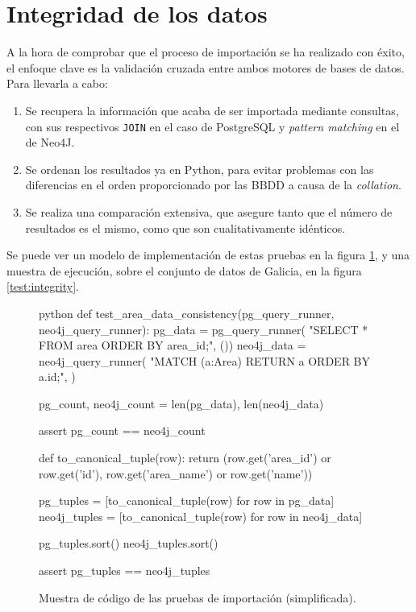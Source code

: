 \section{Integridad de los datos}

A la hora de comprobar que el proceso de importación se ha realizado con éxito, el enfoque clave es la validación cruzada entre ambos motores de bases de datos. Para llevarla a cabo:

\begin{enumerate}
    \item Se recupera la información que acaba de ser importada mediante consultas, con sus respectivos \texttt{JOIN} en el caso de PostgreSQL y \textit{pattern matching} en el de Neo4J.
    \item Se ordenan los resultados ya en Python, para evitar problemas con las diferencias en el orden proporcionado por las BBDD a causa de la \textit{collation}.
    \item Se realiza una comparación extensiva, que asegure tanto que el número de resultados es el mismo, como que son cualitativamente idénticos.
\end{enumerate}

Se puede ver un modelo de implementación de estas pruebas en la figura \ref{test:integrity_code}, y una muestra de ejecución, sobre el conjunto de datos de Galicia, en la figura \ref{test:integrity}.

\begin{figure}[p]
    \centering
    \begin{huggedminted}{python}
def test_area_data_consistency(pg_query_runner, neo4j_query_runner):
    pg_data = pg_query_runner(
        "SELECT * FROM area ORDER BY area_id;", ())
    neo4j_data = neo4j_query_runner(
        "MATCH (a:Area) RETURN a ORDER BY a.id;", {})
    
    pg_count, neo4j_count = len(pg_data), len(neo4j_data)

    assert pg_count == neo4j_count

    def to_canonical_tuple(row):
        return (row.get('area_id') or row.get('id'),
                row.get('area_name') or row.get('name'))

    pg_tuples = [to_canonical_tuple(row) for row in pg_data]
    neo4j_tuples = [to_canonical_tuple(row) for row in neo4j_data]

    pg_tuples.sort()
    neo4j_tuples.sort()

    assert pg_tuples == neo4j_tuples
    \end{huggedminted}
    \caption{Muestra de código de las pruebas de importación (simplificada).}
    \label{test:integrity_code}
\end{figure}

